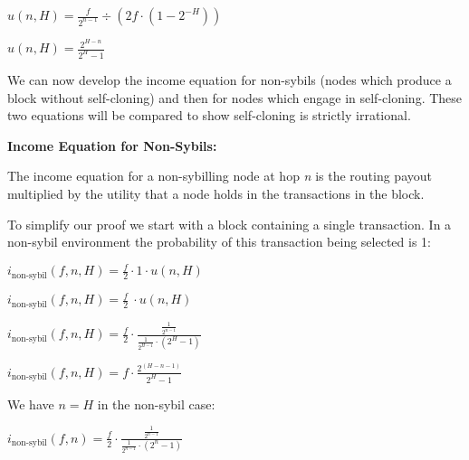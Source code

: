 \documentclass[oneside]{article}   	%
\begin{document}
\begin{multicols}{2}
\begin{adjustwidth}{1.5em}{1.5em}
	\begin{math}
	u(n, H) = \frac{f}{2^{n-1}} \div \left(2f \cdot \left(1-2^{-H}\right)\right)
	\end{math}

	\begin{math}
	u(n, H) = \frac{2^{H - n}}{2^H - 1}
	\end{math}
\end{adjustwidth}
\normalsize

We can now develop the income equation for non-sybils (nodes which produce a block without self-cloning) and then for nodes which engage in self-cloning. These two equations will be compared to show self-cloning is strictly irrational.

\textbf{Income Equation for Non-Sybils:}

The income equation for a non-sybilling node at hop \textit{n} is the routing payout multiplied by the utility that a node holds in the transactions in the block.

To simplify our proof we start with a block containing a single transaction. In a non-sybil environment the probability of this transaction being selected is 1:

\large
\begin{adjustwidth}{1.5em}{1.5em} 
	\begin{math}
i_{\text{non-sybil}}(f, n, H) = \frac{f}{2} \cdot 1 \cdot u(n, H)
	\end{math}

	\begin{math}
i_{\text{non-sybil}}(f, n, H) = \frac{f}{2}\ \cdot u(n,H)
	\end{math}

	\begin{math}
i_{\text{non-sybil}}(f, n, H) = \frac{f}{2} \cdot \frac{\frac{1}{2^{n-1}}}{\frac{1}{2^{H-1}} \cdot (2^{H} -1)}
	\end{math}

	\begin{math}
i_{\text{non-sybil}}(f, n, H) = f \cdot \frac{2^{\left(H - n - 1\right)}}{2^H - 1}
	\end{math}
\end{adjustwidth}
\normalsize

We have \begin{math}n = H\end{math} in the non-sybil case:

\large
\begin{adjustwidth}{1.5em}{1.5em} 
	\begin{math}
i_{\text{non-sybil}}(f, n) = \frac{f}{2} \cdot \frac{\frac{1}{2^{n-1}}}{\frac{1}{2^{n-1}} \cdot (2^{n}-1)}
	\end{math}


\end{adjustwidth}
\end{multicols}
\end{document}
